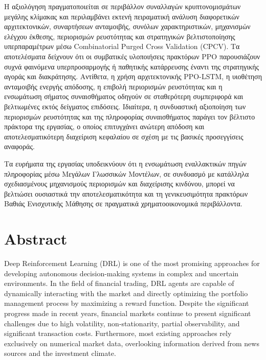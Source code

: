 Η αξιολόγηση πραγματοποιείται σε περιβάλλον συναλλαγών κρυπτονομισμάτων μεγάλης κλίμακας και περιλαμβάνει εκτενή πειραματική ανάλυση διαφορετικών 
αρχιτεκτονικών, συναρτήσεων ανταμοιβής, συνόλων χαρακτηριστικών, μηχανισμών ελέγχου έκθεσης, περιορισμών ρευστότητας και στρατηγικών βελτιστοποίησης 
υπερπαραμέτρων μέσω Combinatorial Purged Cross Validation (CPCV). Τα αποτελέσματα δείχνουν ότι οι συμβατικές υλοποιήσεις πρακτόρων PPO παρουσιάζουν 
συχνά φαινόμενα υπερπροσαρμογής ή παθητικής κατάρρευσης έναντι της στρατηγικής αγοράς και διακράτησης. Αντίθετα, η χρήση αρχιτεκτονικής PPO-LSTM, 
η υιοθέτηση ανταμοιβής ενεργής απόδοσης, η επιβολή περιορισμών ρευστότητας και η ενσωμάτωση σήματος συναισθήματος οδηγούν σε σταθερότερη συμπεριφορά 
και βελτιωμένες εκτός δείγματος επιδόσεις. Ιδιαίτερα, η συνδυαστική αξιοποίηση των περιορισμών ρευστότητας και της πληροφορίας συναισθήματος 
παράγει τον βέλτιστο πράκτορα της εργασίας, ο οποίος επιτυγχάνει ανώτερη απόδοση και αποτελεσματικότερη διαχείριση κεφαλαίου σε σχέση με τις βασικές προσεγγίσεις αναφοράς.

Τα ευρήματα της εργασίας υποδεικνύουν ότι η ενσωμάτωση εναλλακτικών πηγών πληροφορίας μέσω Μεγάλων Γλωσσικών Μοντέλων, σε συνδυασμό με κατάλληλα 
σχεδιασμένους μηχανισμούς περιορισμών και διαχείρισης κινδύνου, μπορεί να βελτιώσει ουσιαστικά την αποτελεσματικότητα και τη γενικευσιμότητα 
πρακτόρων Βαθιάς Ενισχυτικής Μάθησης σε πραγματικά χρηματοοικονομικά περιβάλλοντα.




 
\chapter*{Abstract}

Deep Reinforcement Learning (DRL) is one of the most promising approaches for developing autonomous decision-making systems in complex and uncertain environments. 
In the field of financial trading, DRL agents are capable of dynamically interacting with the market and directly optimizing the portfolio management process 
by maximizing a reward function. Despite the significant progress made in recent years, financial markets continue to present significant challenges due to high 
volatility, non-stationarity, partial observability, and significant transaction costs. Furthermore, most existing approaches rely exclusively on numerical market 
data, overlooking information derived from news sources and the investment climate.

